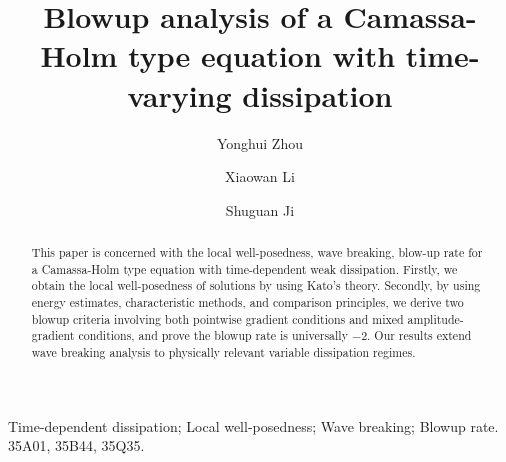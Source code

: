 \documentclass[preprint,12pt]{elsarticle}
\numberwithin{equation}{section}
\begin{document}
\begin{frontmatter}



\title{Blowup analysis of a Camassa-Holm type equation with time-varying dissipation
}

\author[ad1]{Yonghui Zhou}
\author[ad2]{Xiaowan Li}
\author[ad3]{Shuguan Ji}
\address[ad1]{School of Mathematics, Hexi University, Zhangye 734000, P.R. China}
\address[ad2]{College of Mathematics and System Sciences, Xinjiang University, Urumqi, 830046, P.R. China}
\address[ad3]{School of Mathematics and Statistics and Center for Mathematics and Interdisciplinary Sciences, Northeast Normal University, Changchun 130024, P.R. China}



\begin{abstract}
This paper is concerned with the local well-posedness, wave breaking, blow-up rate for a Camassa-Holm type equation with time-dependent weak dissipation. Firstly, we obtain the local well-posedness of solutions by using Kato's theory. Secondly, by using energy estimates, characteristic methods, and comparison principles, we derive two blowup criteria involving both pointwise gradient conditions and mixed amplitude-gradient conditions, and prove the blowup rate is universally $-2$. Our results extend wave breaking analysis to physically relevant variable dissipation regimes.

\end{abstract}


\begin{keyword}
Time-dependent dissipation; Local well-posedness;
Wave breaking; Blowup rate.
\MSC[2020] 35A01, 35B44, 35Q35.
\end{keyword}

\end{frontmatter}
\end{document}

